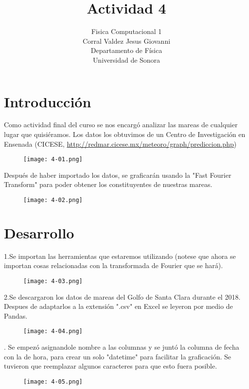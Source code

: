 \documentclass{article}
\title{Actividad 4}
\author{Fisica Computacional 1\\
Corral Valdez Jesus Giovanni\\
Departamento de Física\\
Universidad de Sonora}
\date{}
\begin{document}
\maketitle
\clearpage
\section{Introducción}
Como actividad final del curso se nos encargó analizar las mareas de cualquier lugar que quisiéramos. Los datos los obtuvimos de un Centro de Investigación en Ensenada (CICESE, \url{http://redmar.cicese.mx/meteoro/graph/prediccion.php})
\begin{figure}[h]
  \texttt{[image: 4-01.png]}
\end{figure}


Después de haber importado los datos, se graficarán usando la "Fast Fourier Transform" para poder obtener los constituyentes de nuestras mareas.\\
\begin{figure}[h]
  \texttt{[image: 4-02.png]}
\end{figure}

\clearpage
\section{Desarrollo}
1.Se importan las herramientas que estaremos utilizando (notese que ahora se importan cosas relacionadas con la transformada de Fourier que se hará).\\
\begin{figure}[h]
  \texttt{[image: 4-03.png]}
\end{figure}

2.Se descargaron los datos de mareas del Golfo de Santa Clara durante el 2018. Despues de adaptarlos a la extensión ".csv" en Excel se leyeron por medio de Pandas.\\
\begin{figure}[h]
  \texttt{[image: 4-04.png]}
\end{figure}
. Se empezó asignandole nombre a las columnas y se juntó la columna de fecha con la de hora, para crear un solo "datetime" para facilitar la graficación. Se tuvieron que reemplazar algunos caracteres para que esto fuera posible.\\
\begin{figure}[h]
  \texttt{[image: 4-05.png]}
\end{figure}
\end{document}

